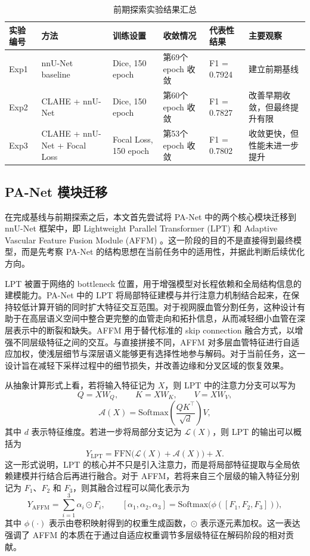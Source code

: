 \documentclass[a4paper,12pt]{article}
\begin{document}
\begin{table}[htbp]
\centering
\caption{前期探索实验结果汇总}
\label{tab:early_experiments}
\begin{tabular}{llllll}
\hline
实验编号 & 方法 & 训练设置 & 收敛情况 & 代表性结果 & 主要观察 \\
\hline
Exp1 & nnU-Net baseline & Dice, 150 epoch & 第69个 epoch 收敛 & F1 = 0.7924 & 建立前期基线 \\
Exp2 & CLAHE + nnU-Net & Dice, 150 epoch & 第60个 epoch 收敛 & F1 = 0.7827 & 改善早期收敛，但最终提升有限 \\
Exp3 & CLAHE + nnU-Net + Focal Loss & Focal Loss, 150 epoch & 第53个 epoch 收敛 & F1 = 0.7802 & 收敛更快，但性能未进一步提升 \\
\hline
\end{tabular}
\end{table}

\subsection{PA-Net 模块迁移}

在完成基线与前期探索之后，本文首先尝试将 PA-Net 中的两个核心模块迁移到 nnU-Net 框架中，即 Lightweight Parallel Transformer (LPT) 和 Adaptive Vascular Feature Fusion Module (AFFM) \cite{luo2025panet}。这一阶段的目的不是直接得到最终模型，而是先考察 PA-Net 的结构思想在当前任务中的适用性，并据此判断后续优化方向。

LPT 被置于网络的 bottleneck 位置，用于增强模型对长程依赖和全局结构信息的建模能力。PA-Net 中的 LPT 将局部特征建模与并行注意力机制结合起来，在保持较低计算开销的同时扩大特征交互范围。对于视网膜血管分割任务，这种设计有助于在高层语义空间中整合更完整的血管走向和拓扑信息，从而减轻细小血管在深层表示中的断裂和缺失。AFFM 用于替代标准的 skip connection 融合方式，以增强不同层级特征之间的交互。与直接拼接不同，AFFM 对多层血管特征进行自适应加权，使浅层细节与深层语义能够更有选择性地参与解码。对于当前任务，这一设计旨在减轻下采样过程中的细节损失，并改善边缘和分叉区域的恢复效果。

从抽象计算形式上看，若将输入特征记为 \(X\)，则 LPT 中的注意力分支可以写为
\[
Q = XW_Q,\qquad K = XW_K,\qquad V = XW_V,
\]
\[
\mathcal{A}(X) = \mathrm{Softmax}\left(\frac{QK^{\top}}{\sqrt{d}}\right)V,
\]
其中 \(d\) 表示特征维度。若进一步将局部分支记为 \(\mathcal{L}(X)\)，则 LPT 的输出可以概括为
\[
Y_{\mathrm{LPT}} = \mathrm{FFN}\big(\mathcal{L}(X) + \mathcal{A}(X)\big) + X.
\]
这一形式说明，LPT 的核心并不只是引入注意力，而是将局部特征提取与全局依赖建模并行结合后再进行融合。对于 AFFM，若将来自三个层级的输入特征分别记为 \(F_1\)、\(F_2\) 和 \(F_3\)，则其融合过程可以简化表示为
\[
Y_{\mathrm{AFFM}} = \sum_{i=1}^{3}\alpha_i \odot F_i,\qquad
[\alpha_1,\alpha_2,\alpha_3] = \mathrm{Softmax}\big(\phi([F_1,F_2,F_3])\big),
\]
其中 \(\phi(\cdot)\) 表示由卷积映射得到的权重生成函数，\(\odot\) 表示逐元素加权。这一表达强调了 AFFM 的本质在于通过自适应权重调节多层级特征在解码阶段的相对贡献。
\end{document}
